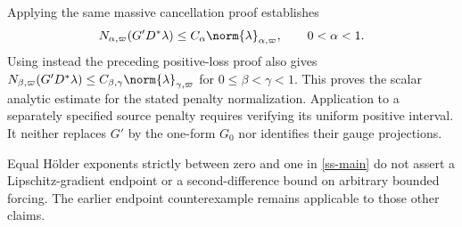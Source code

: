 Applying the same massive cancellation proof establishes
\begin{equation}\label{ss-scalar-right-divergence}
 N_{\alpha,\varpi}(G'D^*\lambda)
       \le C_\alpha\norm{\lambda}_{\alpha,\varpi},
                       \qquad0<\alpha<1.
\end{equation}
Using instead the preceding positive-loss proof also gives
$N_{\beta,\varpi}(G'D^*\lambda)
\le C_{\beta,\gamma}\norm{\lambda}_{\gamma,\varpi}$ for
$0\le\beta<\gamma<1$. This proves the scalar analytic estimate
for the stated penalty normalization. Application to a separately
specified source penalty requires verifying its uniform positive
interval. It neither replaces $G'$ by the one-form $G_0$ nor
identifies their gauge projections.

Equal H\"older exponents strictly between zero and one in
\eqref{ss-main} do not assert a Lipschitz-gradient endpoint or a
second-difference bound on arbitrary bounded forcing. The earlier
endpoint counterexample remains applicable to those other claims.
